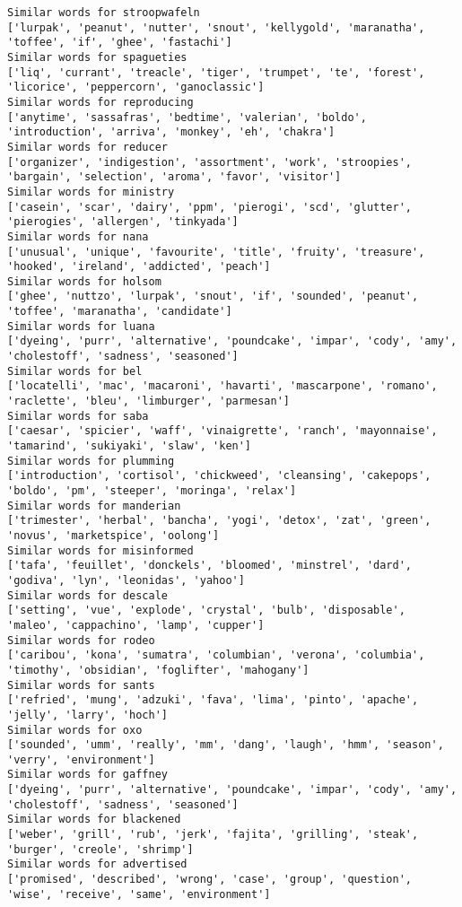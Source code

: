 \documentclass[11pt]{article}
\begin{document}
\begin{Verbatim}[commandchars=\\\{\}]
Similar words for stroopwafeln
['lurpak', 'peanut', 'nutter', 'snout', 'kellygold', 'maranatha', 'toffee', 'if', 'ghee', 'fastachi']
Similar words for spagueties
['liq', 'currant', 'treacle', 'tiger', 'trumpet', 'te', 'forest', 'licorice', 'peppercorn', 'ganoclassic']
Similar words for reproducing
['anytime', 'sassafras', 'bedtime', 'valerian', 'boldo', 'introduction', 'arriva', 'monkey', 'eh', 'chakra']
Similar words for reducer
['organizer', 'indigestion', 'assortment', 'work', 'stroopies', 'bargain', 'selection', 'aroma', 'favor', 'visitor']
Similar words for ministry
['casein', 'scar', 'dairy', 'ppm', 'pierogi', 'scd', 'glutter', 'pierogies', 'allergen', 'tinkyada']
Similar words for nana
['unusual', 'unique', 'favourite', 'title', 'fruity', 'treasure', 'hooked', 'ireland', 'addicted', 'peach']
Similar words for holsom
['ghee', 'nuttzo', 'lurpak', 'snout', 'if', 'sounded', 'peanut', 'toffee', 'maranatha', 'candidate']
Similar words for luana
['dyeing', 'purr', 'alternative', 'poundcake', 'impar', 'cody', 'amy', 'cholestoff', 'sadness', 'seasoned']
Similar words for bel
['locatelli', 'mac', 'macaroni', 'havarti', 'mascarpone', 'romano', 'raclette', 'bleu', 'limburger', 'parmesan']
Similar words for saba
['caesar', 'spicier', 'waff', 'vinaigrette', 'ranch', 'mayonnaise', 'tamarind', 'sukiyaki', 'slaw', 'ken']
Similar words for plumming
['introduction', 'cortisol', 'chickweed', 'cleansing', 'cakepops', 'boldo', 'pm', 'steeper', 'moringa', 'relax']
Similar words for manderian
['trimester', 'herbal', 'bancha', 'yogi', 'detox', 'zat', 'green', 'novus', 'marketspice', 'oolong']
Similar words for misinformed
['tafa', 'feuillet', 'donckels', 'bloomed', 'minstrel', 'dard', 'godiva', 'lyn', 'leonidas', 'yahoo']
Similar words for descale
['setting', 'vue', 'explode', 'crystal', 'bulb', 'disposable', 'maleo', 'cappachino', 'lamp', 'cupper']
Similar words for rodeo
['caribou', 'kona', 'sumatra', 'columbian', 'verona', 'columbia', 'timothy', 'obsidian', 'foglifter', 'mahogany']
Similar words for sants
['refried', 'mung', 'adzuki', 'fava', 'lima', 'pinto', 'apache', 'jelly', 'larry', 'hoch']
Similar words for oxo
['sounded', 'umm', 'really', 'mm', 'dang', 'laugh', 'hmm', 'season', 'verry', 'environment']
Similar words for gaffney
['dyeing', 'purr', 'alternative', 'poundcake', 'impar', 'cody', 'amy', 'cholestoff', 'sadness', 'seasoned']
Similar words for blackened
['weber', 'grill', 'rub', 'jerk', 'fajita', 'grilling', 'steak', 'burger', 'creole', 'shrimp']
Similar words for advertised
['promised', 'described', 'wrong', 'case', 'group', 'question', 'wise', 'receive', 'same', 'environment']

\end{Verbatim}
\end{document}
